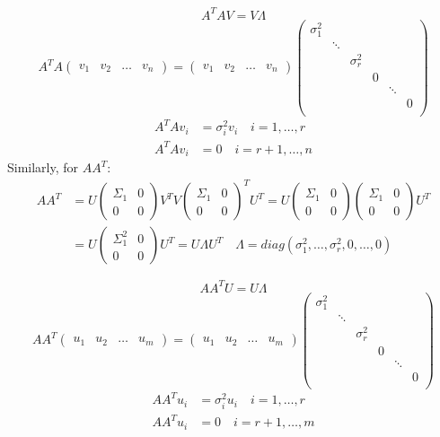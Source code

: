 $$A^TAV = V\Lambda$$
$$
A^TA \begin{pmatrix} v_1 & v_2 & \ldots & v_n \end{pmatrix}
= \begin{pmatrix} v_1 & v_2 & \ldots & v_n \end{pmatrix}
\begin{pmatrix}
    \sigma_1^2 \\
    & \ddots \\
    & & \sigma_r^2 \\
    & & & 0 \\
    & & & & \ddots \\
    & & & & & 0 \\
\end{pmatrix}
$$
$$
\begin{aligned}
    A^TAv_i &= \sigma_i^2 v_i \quad i=1, \ldots, r \\
    A^TAv_i &= 0 \quad i=r+1, \ldots, n
\end{aligned}
$$
Similarly, for $AA^T$:
\[ 
    \begin{aligned}
        AA^T &= U\begin{pmatrix} \Sigma_1 & 0 \\ 0 & 0 \end{pmatrix} V^T V \begin{pmatrix} \Sigma_1 & 0 \\ 0 & 0 \end{pmatrix}^T U^T = U \begin{pmatrix} \Sigma_1 & 0 \\ 0 & 0 \end{pmatrix} \begin{pmatrix} \Sigma_1 & 0 \\ 0 & 0 \end{pmatrix} U^T\\
        &= U \begin{pmatrix} \Sigma_1^2 & 0 \\ 0 & 0 \end{pmatrix} U^T = U\Lambda U^T \quad \Lambda = diag(\sigma_1^2, \ldots, \sigma_r^2, 0, \ldots, 0)
    \end{aligned}
\]

$$AA^TU = U\Lambda$$
$$
AA^T \begin{pmatrix} u_1 & u_2 & \ldots & u_m \end{pmatrix}
= \begin{pmatrix} u_1 & u_2 & \ldots & u_m \end{pmatrix}
\begin{pmatrix}
    \sigma_1^2 \\
    & \ddots \\
    & & \sigma_r^2 \\
    & & & 0 \\
    & & & & \ddots \\
    & & & & & 0 \\
\end{pmatrix}
$$
$$
\begin{aligned}
    AA^Tu_i &= \sigma_i^2 u_i \quad i=1, \ldots, r \\
    AA^Tu_i &= 0 \quad i=r+1, \ldots, m
\end{aligned}
$$
